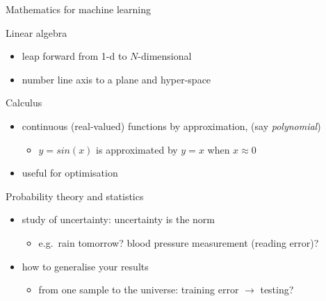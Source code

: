 \documentclass[ignorenonframetext,]{beamer}
\providecommand{\tightlist}{%
  \setlength{\itemsep}{0pt}\setlength{\parskip}{0pt}}
\begin{document}
\begin{frame}{Mathematics for machine learning}
\protect\hypertarget{mathematics-for-machine-learning}{}

Linear algebra

\begin{itemize}
\tightlist
\item
  leap forward from 1-d to \(N\)-dimensional
\item
  number line axis to a plane and hyper-space 
\end{itemize}

\bigskip Calculus

\begin{itemize}
\tightlist
\item
  continuous (real-valued) functions by approximation, (say
  \emph{polynomial})

  \begin{itemize}
  \tightlist
  \item
    \(y= sin(x)\) is approximated by \(y=x\) when \(x \approx 0\)
  \end{itemize}
\item
  useful for optimisation
\end{itemize}

\bigskip Probability theory and statistics

\begin{itemize}
\tightlist
\item
  study of uncertainty: uncertainty is the norm

  \begin{itemize}
  \tightlist
  \item
    e.g.~rain tomorrow? blood pressure measurement (reading error)?
  \end{itemize}
\item
  how to generalise your results

  \begin{itemize}
  \tightlist
  \item
    from one sample to the universe: training error \(\rightarrow\)
    testing?
  \end{itemize}
\end{itemize}

\end{frame}
\end{document}

